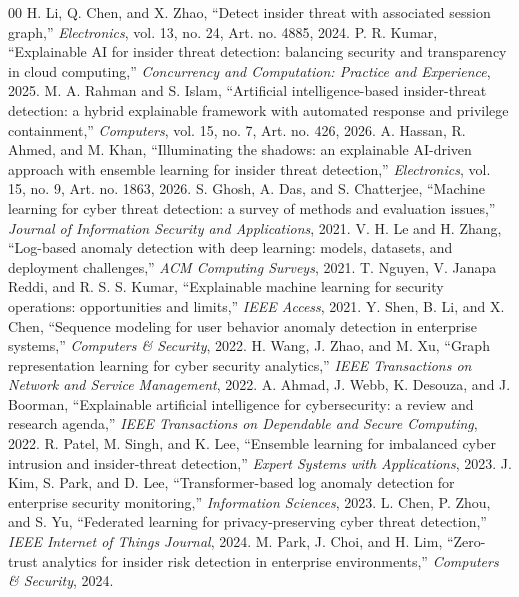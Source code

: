 \documentclass[journal]{IEEEtran}
\begin{document}
\begin{thebibliography}{00}
 H. Li, Q. Chen, and X. Zhao, ``Detect insider threat with associated session graph,'' \emph{Electronics}, vol. 13, no. 24, Art. no. 4885, 2024.
 P. R. Kumar, ``Explainable AI for insider threat detection: balancing security and transparency in cloud computing,'' \emph{Concurrency and Computation: Practice and Experience}, 2025.
 M. A. Rahman and S. Islam, ``Artificial intelligence-based insider-threat detection: a hybrid explainable framework with automated response and privilege containment,'' \emph{Computers}, vol. 15, no. 7, Art. no. 426, 2026.
 A. Hassan, R. Ahmed, and M. Khan, ``Illuminating the shadows: an explainable AI-driven approach with ensemble learning for insider threat detection,'' \emph{Electronics}, vol. 15, no. 9, Art. no. 1863, 2026.
 S. Ghosh, A. Das, and S. Chatterjee, ``Machine learning for cyber threat detection: a survey of methods and evaluation issues,'' \emph{Journal of Information Security and Applications}, 2021.
 V. H. Le and H. Zhang, ``Log-based anomaly detection with deep learning: models, datasets, and deployment challenges,'' \emph{ACM Computing Surveys}, 2021.
 T. Nguyen, V. Janapa Reddi, and R. S. S. Kumar, ``Explainable machine learning for security operations: opportunities and limits,'' \emph{IEEE Access}, 2021.
 Y. Shen, B. Li, and X. Chen, ``Sequence modeling for user behavior anomaly detection in enterprise systems,'' \emph{Computers \& Security}, 2022.
 H. Wang, J. Zhao, and M. Xu, ``Graph representation learning for cyber security analytics,'' \emph{IEEE Transactions on Network and Service Management}, 2022.
 A. Ahmad, J. Webb, K. Desouza, and J. Boorman, ``Explainable artificial intelligence for cybersecurity: a review and research agenda,'' \emph{IEEE Transactions on Dependable and Secure Computing}, 2022.
 R. Patel, M. Singh, and K. Lee, ``Ensemble learning for imbalanced cyber intrusion and insider-threat detection,'' \emph{Expert Systems with Applications}, 2023.
 J. Kim, S. Park, and D. Lee, ``Transformer-based log anomaly detection for enterprise security monitoring,'' \emph{Information Sciences}, 2023.
 L. Chen, P. Zhou, and S. Yu, ``Federated learning for privacy-preserving cyber threat detection,'' \emph{IEEE Internet of Things Journal}, 2024.
 M. Park, J. Choi, and H. Lim, ``Zero-trust analytics for insider risk detection in enterprise environments,'' \emph{Computers \& Security}, 2024.

\end{thebibliography}
\end{document}
